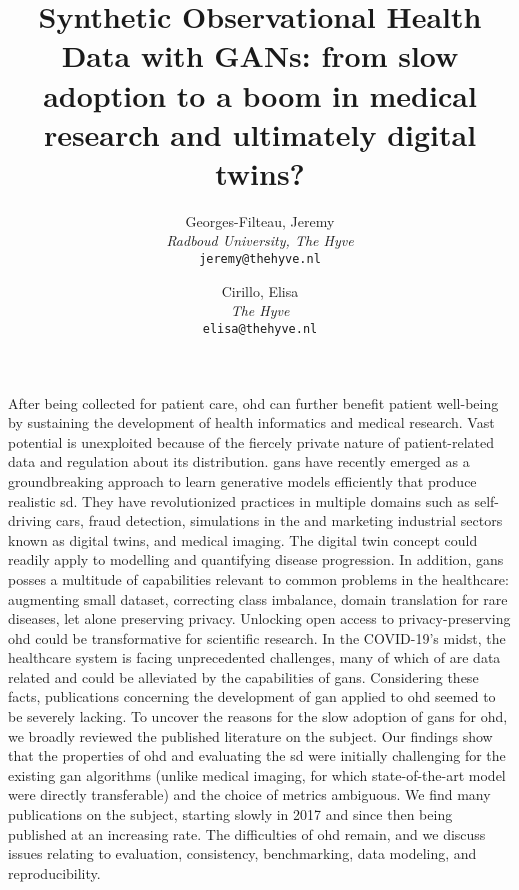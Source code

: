 \documentclass[10pt]{article}
\title{ Synthetic Observational Health Data with GANs: from slow adoption to a boom in medical research and ultimately digital twins?}
\author{
  Georges-Filteau, Jeremy \href{https://orcid.org/0000-0002-0352-6468}{}\\[0.2cm]
  \small \textit{Radboud University, The Hyve}\\
  \small\texttt{jeremy@thehyve.nl}
  \and
  Cirillo, Elisa \href{https://orcid.org/0000-0002-0241-7833}{}\\[0.2cm]
  \small \textit{The Hyve}\\
  \small\texttt{elisa@thehyve.nl}
}
\renewenvironment{abstract}
 {{\noindent\bfseries{\abstractname}\par\nobreak}\footnotesize}
 {\bigskip}
\begin{document}
    \maketitle
    \vspace{-1em}

    \begingroup
    \let\center\flushleft
    \let\endcenter\endflushleft
    \maketitle
    \endgroup


    \glsresetall
    \begin{abstract}
    After being collected for patient care, \gls{ohd} can further benefit patient well-being by sustaining the development of health informatics and medical research. Vast potential is unexploited because of the fiercely private nature of patient-related data and regulation about its distribution. 
    \glspl{gan} have recently emerged as a groundbreaking approach to learn generative models efficiently that produce realistic \gls{sd}. They have revolutionized practices in multiple domains such as self-driving cars, fraud detection, simulations in the and marketing industrial sectors known as digital twins, and medical imaging. The digital twin concept could readily apply to modelling and quantifying disease progression. In addition, \glspl{gan} posses a multitude of capabilities relevant to common problems in the healthcare: augmenting small dataset, correcting class imbalance, domain translation for rare diseases, let alone preserving privacy. Unlocking open access to privacy-preserving \gls{ohd} could be transformative for scientific research. In the COVID-19's midst, the healthcare system is facing unprecedented challenges, many of which of are data related and could be alleviated by the capabilities of \glspl{gan}.
   Considering these facts, publications concerning the development of  \gls{gan} applied to \gls{ohd} seemed to be severely lacking. To uncover the reasons for the slow adoption of \glspl{gan} for \gls{ohd}, we broadly reviewed the published literature on the subject. Our findings show that the properties of \gls{ohd} and evaluating the \gls{sd} were initially challenging for the existing \gls{gan} algorithms (unlike medical imaging, for which state-of-the-art model were directly transferable) and the choice of metrics ambiguous. We find many publications on the subject, starting slowly in 2017 and since then being published at an increasing rate. The difficulties of \gls{ohd} remain, and we discuss issues relating to evaluation, consistency, benchmarking, data modeling, and reproducibility.
    \end{abstract} 

    
    
    
    
    
    

    \pagebreak

    \printglossary[type=oalgo]
    \printglossary[type=\acronymtype]

    \pagebreak

    
\end{document}
